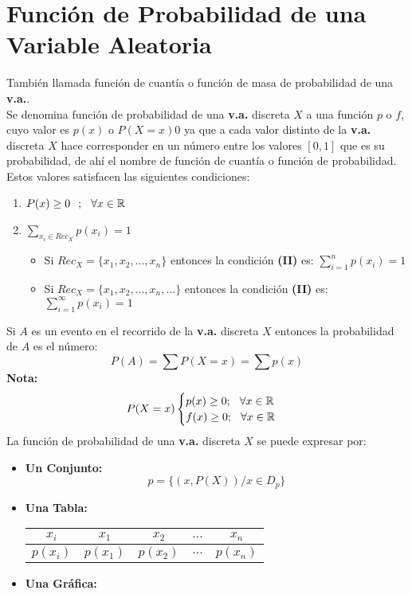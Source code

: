 \section{Función de Probabilidad de una Variable Aleatoria}
\noindent También llamada función de cuantía o función de masa de probabilidad de una \textbf{v.a.}. \\${ }$\\
Se denomina función de probabilidad de una \textbf{v.a.} discreta $X$ a una función $p$ o $f$, cuyo valor es $p(x)$ o $P(X=x)0$ ya que a cada valor distinto de la \textbf{v.a.} discreta $X$ hace corresponder en un número entre los valores $[0,1]$ que es su probabilidad, de ahí el nombre de función de cuantía o función de probabilidad. Estos valores satisfacen las siguientes condiciones:
\begin{enumerate}
\item $P(x)\geq 0 \hspace{0.25cm};\hspace{0.25cm} \forall x\in \mathbb{R}$
\item $\displaystyle\sum_{x_i\in Rec_X}^{}p(x_i)=1$
\begin{itemize}
\item Si $Rec_X=\lbrace x_1,x_2,\ldots ,x_n \rbrace$ entonces la condición \textbf{(II)} es: $\displaystyle\sum_{i=1}^{n}p(x_i)=1$
\item Si $Rec_X=\lbrace x_1,x_2,\ldots ,x_n,\ldots \rbrace$ entonces la condición \textbf{(II)} es: $\displaystyle\sum_{i=1}^{\infty}p(x_i)=1$
\end{itemize}
\end{enumerate}
Si $A$ es un evento en el recorrido de la \textbf{v.a.} discreta $X$ entonces la probabilidad de $A$ es el número:
$$P(A)=\displaystyle\sum P(X=x)=\sum p(x)$$
\textbf{Nota:}
$$P(X=x)
\begin{cases}
p(x)\geq 0 ;\hspace{0.25cm} \forall x\in \mathbb{R} \\
f(x)\geq 0 ;\hspace{0.25cm} \forall x\in \mathbb{R}
\end{cases}
$$
La función de probabilidad de una \textbf{v.a.} discreta $X$ se puede expresar por:
\begin{itemize}
\item \textbf{Un Conjunto:} 
$$p=\lbrace (x,P(X))/x\in D_p \rbrace$$
\item \textbf{Una Tabla:}
\begin{center}
\begin{tabular}{|c|c|c|c|c|}
\hline 
$x_i$ & $x_1$ & $x_2$ & $\ldots$ & $x_n$ \\ 
\hline 
$p(x_i)$ & $p(x_1)$ & $p(x_2)$ & $\ldots$ & $p(x_n)$ \\ 
\hline 
\end{tabular} 
\end{center}
\item \textbf{Una Gráfica:}
\end{itemize}
